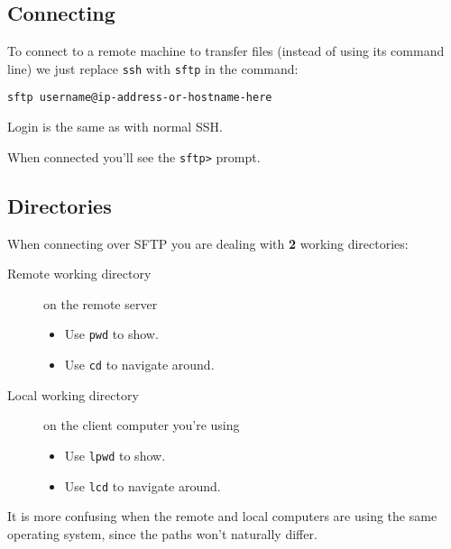 \documentclass[slides]{pgnotes}
\begin{document}
\subsection{Connecting}

To connect to a remote machine to transfer files (instead of using its command line) we just replace \texttt{ssh} with \texttt{sftp} in the command:

\begin{verbatim}
sftp username@ip-address-or-hostname-here
\end{verbatim}

Login is the same as with normal SSH.

When connected you'll see the \texttt{sftp>} prompt.


\subsection{Directories}

When connecting over SFTP you are dealing with \textbf{2} working directories:
\begin{description}
\item[Remote working directory ] on the remote server
  \begin{itemize}
  \item Use \texttt{pwd} to show.
  \item Use \texttt{cd} to navigate around.
  \end{itemize}
\item[Local working directory] on the client computer you're using
  \begin{itemize}
  \item Use \texttt{lpwd} to show.
  \item Use \texttt{lcd} to navigate around.
  \end{itemize}
\end{description}
It is more confusing when the remote and local computers are using the same operating system, since the paths won't naturally differ.
\end{document}
